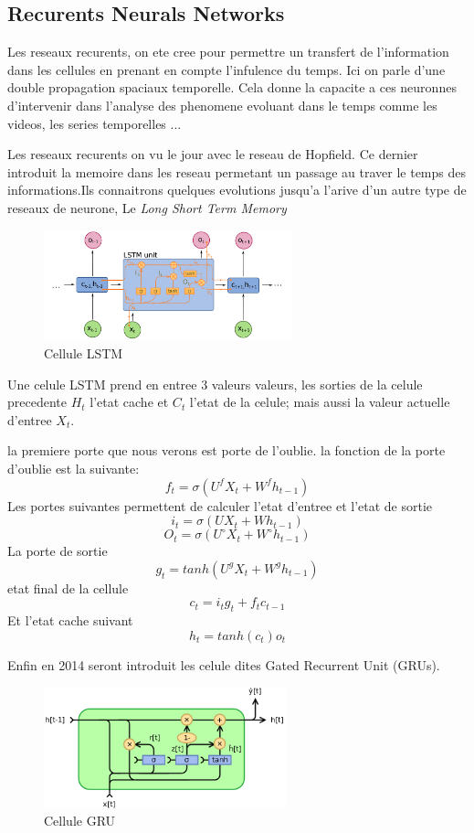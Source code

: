 \documentclass[twoside,twocolumn]{article}
\begin{document}
\subsection{Recurents Neurals Networks}

Les reseaux recurents, on ete cree pour permettre un transfert de l'information dans les cellules en prenant en compte l'infulence du temps. 
Ici on parle d'une double propagation spaciaux temporelle. Cela donne la capacite a ces neuronnes d'intervenir dans l'analyse des phenomene evoluant dans le temps comme les videos, les series temporelles ...

Les reseaux recurents on vu le jour avec le reseau de Hopfield\cite{Hopfield}. Ce dernier introduit la memoire dans les reseau permetant un passage au traver le temps des informations.Ils connaitrons quelques evolutions jusqu'a l'arive d'un autre type 
de reseaux de neurone, Le \textit{Long Short Term Memory}\cite{lstm1}

\begin{figure}[h]
  \centering
  \includegraphics[width=72mm]{Long_Short-Term_Memory.png}
  \caption{Cellule LSTM}
  \label{lstm}
\end{figure}

Une celule LSTM prend en entree 3 valeurs valeurs, les sorties de la celule precedente $H_t$ l'etat cache et $C_t$ l'etat de la celule; mais aussi la valeur actuelle d'entree $X_t$. 

la premiere porte que nous verons est porte de l'oublie. la fonction de la porte d'oublie est la suivante:
\[f_t = \sigma(U^fX_t + W^fh_{t-1})\]
Les portes suivantes permettent de calculer l'etat d'entree et l'etat de sortie
\[i_t = \sigma(UX_t + Wh_{t-1})\]
\[O_t = \sigma(U^{\circ}X_t + W^{\circ}h_{t-1})\]
La porte de sortie
\[g_t = tanh(U^gX_t + W^gh_{t-1})\]
etat final de la cellule
\[c_t = i_tg_t + f_tc_{t-1}\]
Et l'etat cache suivant
\[h_t = tanh(c_t)o_t\]

Enfin en 2014 seront introduit les celule dites Gated Recurrent Unit (GRUs)\cite{cho2014learning}. 

\begin{figure}[h]
  \centering
  \includegraphics[width=70mm]{GRU.png}
  \caption{Cellule GRU}
  \label{GRUs}
\end{figure}
\end{document}
